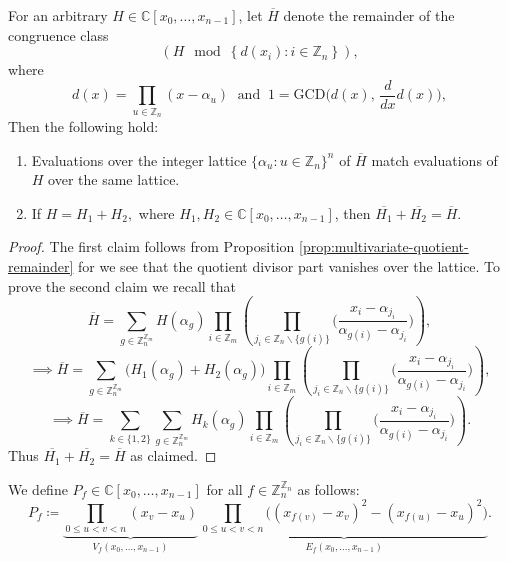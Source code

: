  \begin{proposition}\label{prop:ring-homomorphism}
For an arbitrary $H\in\mathbb{C}\left[x_{0},\ldots,x_{n-1}\right]$, let $\overline{H}$ denote
the {remainder} of the congruence class 
\[
\left( H\mod\left\{ d(x_{i}):i\in\mathbb{Z}_{n}\right\} \right),
\]
where
\[
d(x)=\prod_{u\in\mathbb{Z}_{n}}(x-\alpha_{u})\;\text{ and }\:1=\text{GCD}\big(d(x),\,\frac{d}{dx}d(x)\big),
\]
Then the following hold:
\begin{enumerate}
    \item Evaluations over the integer lattice $\{\alpha_{u}:u\in\mathbb{Z}_{n}\}^{n}$ of $\overline{H}$ match evaluations of $H$ over the same lattice. 
    \item If $H = H_1 + H_2,$ where $H_1, H_2 \in \mathbb{C}\left[x_{0},\ldots,x_{n-1}\right]$, then $\overline{H_1} + \overline{H_2} = \overline{H}$.
\end{enumerate}
 \end{proposition}
\begin{proof}
  The first claim follows from Proposition \ref{prop:multivariate-quotient-remainder} for we see that the quotient divisor part vanishes over the lattice. To prove the second claim we recall that
  \[
\overline{H}=\sum_{g\in\mathbb{Z}_{n}^{\mathbb{Z}_{m}}}H(\alpha_{g})\prod_{i\in\mathbb{Z}_{m}}\left(\prod_{j_{i}\in\mathbb{Z}_{n}\backslash\{g(i)\}}\bigg(\frac{x_{i}-\alpha_{j_{i}}}{\alpha_{g(i)}-\alpha_{j_{i}}}\bigg)\right),
  \]
  \[
  \implies\overline{H}=\sum_{g\in\mathbb{Z}_{n}^{\mathbb{Z}_{m}}}\big(H_{1}(\alpha_{g})+H_{2}(\alpha_{g})\big)\prod_{i\in\mathbb{Z}_{m}}\left(\prod_{j_{i}\in\mathbb{Z}_{n}\backslash\{g(i)\}}\bigg(\frac{x_{i}-\alpha_{j_{i}}}{\alpha_{g(i)}-\alpha_{j_{i}}}\bigg)\right),
  \]
  \[
  \implies\overline{H}=\sum_{k\in\{1,2\}}\sum_{g\in\mathbb{Z}_{n}^{\mathbb{Z}_{m}}}H_{k}(\alpha_{g})\prod_{i\in\mathbb{Z}_{m}}\left(\prod_{j_{i}\in\mathbb{Z}_{n}\backslash\{g(i)\}}\bigg(\frac{x_{i}-\alpha_{j_{i}}}{\alpha_{g(i)}-\alpha_{j_{i}}}\bigg)\right).
  \]
  Thus $\overline{H_1} + \overline{H_2} = \overline{H}$ as claimed.
\end{proof}
\begin{defn}\label{defn:polynomial-grace-definition} We define $P_f \in \mathbb{C}[x_0, \ldots, x_{n-1}]$ for all $f \in \mathbb{Z}_n^{\mathbb{Z}_n}$ as follows:
\begin{equation}
    P_f \coloneq \underbrace{\prod_{0\le u<v<n}(x_{v}-x_{u})}_{V_f(x_0,\ldots,x_{n-1})}\,\underbrace{\prod_{0\le u<v<n}\big((x_{f(v)}-x_{v})^{2}-(x_{f(u)}-x_{u})^{2}\big)}_{E_f(x_0,\ldots,x_{n-1})}.
\end{equation}
\end{defn}
